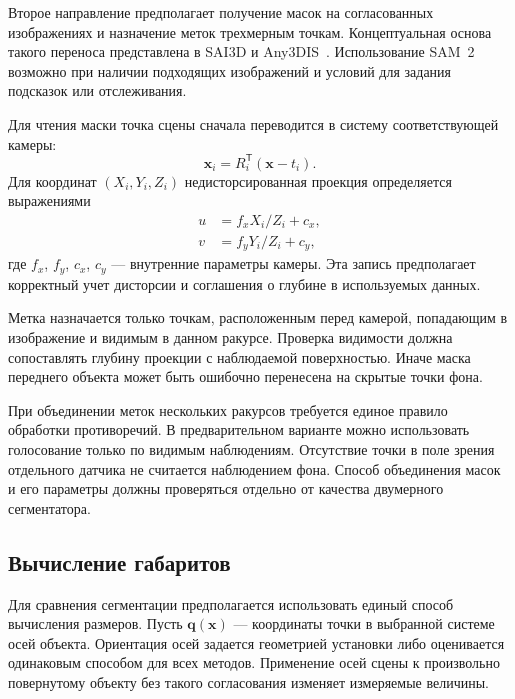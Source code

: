 \documentclass{misisarticle}
\begin{document}
Второе направление предполагает получение масок на согласованных изображениях и назначение меток трехмерным точкам. Концептуальная основа такого переноса представлена в SAI3D и Any3DIS~\cite{yin2024,nguyen2025}. Использование SAM~2 возможно при наличии подходящих изображений и условий для задания подсказок или отслеживания.

Для чтения маски точка сцены сначала переводится в систему соответствующей камеры:
\begin{equation}
    \mathbf{x}_i=R_i^{\mathsf{T}}(\mathbf{x}-t_i).
\end{equation}
Для координат $(X_i,Y_i,Z_i)$ недисторсированная проекция определяется выражениями
\begin{equation}
\begin{aligned}
    u&=f_x X_i/Z_i+c_x,\\
    v&=f_y Y_i/Z_i+c_y,
\end{aligned}
\label{eq:projection}
\end{equation}
где $f_x$, $f_y$, $c_x$, $c_y$ --- внутренние параметры камеры. Эта запись предполагает корректный учет дисторсии и соглашения о глубине в используемых данных.

Метка назначается только точкам, расположенным перед камерой, попадающим в изображение и видимым в данном ракурсе. Проверка видимости должна сопоставлять глубину проекции с наблюдаемой поверхностью. Иначе маска переднего объекта может быть ошибочно перенесена на скрытые точки фона.

При объединении меток нескольких ракурсов требуется единое правило обработки противоречий. В предварительном варианте можно использовать голосование только по видимым наблюдениям. Отсутствие точки в поле зрения отдельного датчика не считается наблюдением фона. Способ объединения масок и его параметры должны проверяться отдельно от качества двумерного сегментатора.

\subsection{Вычисление габаритов}

Для сравнения сегментации предполагается использовать единый способ вычисления размеров. Пусть $\mathbf{q}(\mathbf{x})$ --- координаты точки в выбранной системе осей объекта. Ориентация осей задается геометрией установки либо оценивается одинаковым способом для всех методов. Применение осей сцены к произвольно повернутому объекту без такого согласования изменяет измеряемые величины.
\end{document}
